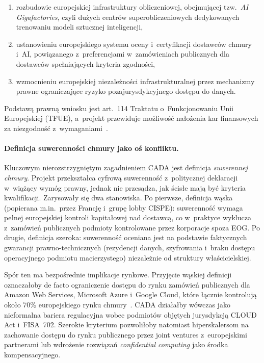 \begin{enumerate}[label=(\roman*)]
  \item rozbudowie europejskiej infrastruktury obliczeniowej, obejmującej
    tzw.\ \textit{AI Gigafactories}, czyli dużych centrów superobliczeniowych
    dedykowanych trenowaniu modeli sztucznej inteligencji,
  \item ustanowieniu europejskiego systemu oceny i~certyfikacji dostawców
    chmury i~AI, powiązanego z~preferencjami w~zamówieniach publicznych
    dla dostawców spełniających kryteria zgodności,
  \item wzmocnieniu europejskiej niezależności infrastrukturalnej
    przez mechanizmy prawne ograniczające ryzyko pozajurysdykcyjnego dostępu
    do danych.
\end{enumerate}

Podstawą prawną wniosku jest art.~114 Traktatu o~Funkcjonowaniu Unii
Europejskiej (TFUE), a~projekt przewiduje możliwość nałożenia kar finansowych
za niezgodność z~wymaganiami~\autocite{cada2026}.

\paragraph{Definicja suwerenności chmury jako oś konfliktu.}
Kluczowym nierozstrzygniętym zagadnieniem CADA jest definicja
\textit{suwerennej chmury}. Projekt przekształca cyfrową suwerenność
z~politycznej deklaracji w~wiążący wymóg prawny, jednak nie przesądza,
jak ścisłe mają być kryteria kwalifikacji. Zarysowały się dwa
stanowiska. Po pierwsze, {definicja wąska} (popierana m.in.\
przez Francję i~grupę lobby CISPE): suwerenność wymaga pełnej europejskiej
kontroli kapitałowej nad dostawcą, co w~praktyce wyklucza z~zamówień
publicznych podmioty kontrolowane przez korporacje spoza EOG.
Po drugie, {definicja szeroka}: suwerenność oceniana jest
na podstawie faktycznych gwarancji prawno-technicznych (rezydencji danych,
szyfrowania i~braku dostępu operacyjnego podmiotu macierzystego)
niezależnie od struktury właścicielskiej.

Spór ten ma bezpośrednie implikacje rynkowe. Przyjęcie wąskiej definicji
oznaczałoby de facto ograniczenie dostępu do rynku zamówień publicznych
dla Amazon Web Services, Microsoft Azure i~Google Cloud, które łącznie
kontrolują około 70\% europejskiego rynku chmury~\autocite{synergy2025eu}.
CADA działałby wówczas jako nieformalna bariera regulacyjna wobec podmiotów
objętych jurysdykcją CLOUD Act i~FISA~702. Szerokie kryterium pozwoliłoby
natomiast hiperskalersom na zachowanie dostępu do rynku publicznego
przez joint ventures z~europejskimi partnerami lub wdrożenie rozwiązań
\textit{confidential computing} jako środka kompensacyjnego.

